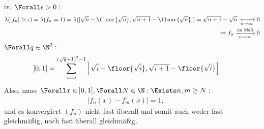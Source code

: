 \begin{solution}
\begin{itemize}
  \item[iv.] $\Forall \epsilon > 0:$
  \begin{align*}
    \lambda(|f_n| > \epsilon)
    =
    \lambda(f_n = 1)
    =
    \lambda
    ([\sqrt{n} - \floor{\sqrt{n}}, \sqrt{n+1} - \floor{\sqrt{n}}])
    =
    \sqrt{n+1} - \sqrt{n}
    \xrightarrow[n \to \infty]{} 0 \\
    \Rightarrow
    f_n \xrightarrow[n \to \infty]{\text{im Maß}} 0
  \end{align*}
  $\Forall q \in \N^2:$
  \begin{align*}
    ]0, 1]
    =
    \sum_{i = q}^{(\sqrt{q}+1)^2-1}
    \left ]
    \sqrt{i} - \floor{\sqrt{i}}, \sqrt{i+1} - \floor{\sqrt{i}}
    \right ]
  \end{align*}
  Also, muss $\Forall x \in \: ]0, 1], \Forall N \in \N: \Exists n, m \geq N:$
  \begin{align*}
    |f_n(x) - f_m(x)| = 1,
  \end{align*}
  und es konvergiert $(f_n)$ nicht fast überall und somit auch weder fast gleichmäßig, noch fast überall gleichmäßig.

\end{itemize}

\end{solution}
